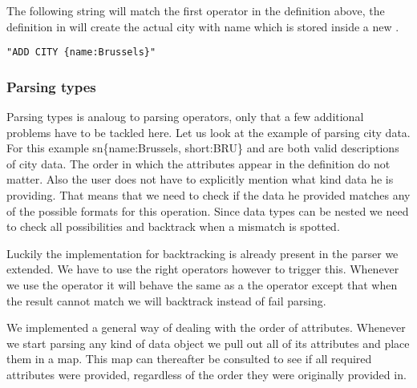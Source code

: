 \par
The following string will match the first operator in the definition above, the
definition in  will create the actual city with name
 which is stored inside a new .

\begin{lstlisting}
"ADD CITY {name:Brussels}"
\end{lstlisting}


\subsubsection{Parsing types}

Parsing types is analoug to parsing operators, only that a few additional
problems have to be tackled here. Let us look at the example of parsing city
data. For this example sn{\{name:Brussels, short:BRU\}} and  are both valid descriptions of city data. The order in which
the attributes appear in the definition do not matter. Also the user does not
have to explicitly mention what kind data he is providing. That means that we
need to check if the data he provided matches any of the possible formats for
this operation. Since data types can be nested we need to check all
possibilities and backtrack when a mismatch is spotted.

\par
Luckily the implementation for backtracking is already present in the parser we
extended. We have to use the right operators however to trigger this. Whenever
we use the  operator it will behave the same as a the
\sn{\textasciicircum\textasciicircum} operator except that when the result cannot
match we will backtrack instead of fail parsing.

\par
We implemented a general way of dealing with the order of attributes. Whenever
we start parsing any kind of data object we pull out all of its attributes and
place them in a map. This map can thereafter be consulted to see if all required
attributes were provided, regardless of the order they were originally provided
in.
